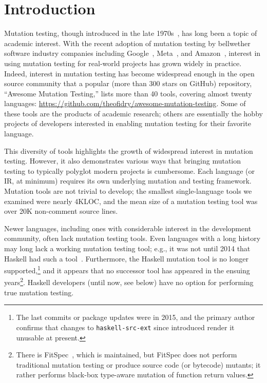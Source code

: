 \documentclass[sigconf,review, anonymous]{acmart}
\begin{document}
\maketitle



\section{Introduction}

Mutation testing, though introduced in the late
1970s~\cite{demillo1978hints,mathur2012foundations,demillo1978hints},
has long been a topic of academic interest.  With the recent adoption of mutation
testing by bellwether software industry companies including
Google~\cite{GoogleMut}, Meta~\cite{BellerFacebookMutation}, and
Amazon~\cite{AmazonMut}, interest in using mutation testing for
real-world projects has grown widely in practice. 
%
Indeed, interest in mutation testing has become widespread enough in the open
source community that a popular (more than 300 stars on GitHub)
repository, ``Awesome Mutation Testing,'' lists more than 40 tools,
covering almost twenty languages:
\url{https://github.com/theofidry/awesome-mutation-testing}.  Some of
these tools are the products of academic research; others are
essentially the hobby projects of developers interested in enabling
mutation testing for their favorite language.

This diversity of tools highlights the growth of widespread interest in mutation
testing.  However, it also demonstrates various ways that bringing mutation testing to
typically polyglot modern projects is cumbersome. Each language (or IR, at
minimum) requires its own underlying mutation and testing framework.
Mutation tools are not trivial to develop; the smallest
single-language tools we examined were nearly 4KLOC, and the mean size
of a mutation testing tool was over 20K non-comment source lines.

Newer languages, including ones with considerable interest
in the development community, often lack mutation testing tools.  Even
languages with a long history may long lack a working mutation testing
tool; e.g., it was not until 2014 that Haskell had such a tool~\cite{mucheck}. 
%
Furthermore, the Haskell mutation tool is no longer
supported,\footnote{The last commits or package updates were in 2015, and the
primary author confirms that changes to {\tt haskell-src-ext} since
introduced render it unusable at present.} and it
appears that no successor tool has appeared in the ensuing
years\footnote{There is FitSpec~\cite{FitSpec}, which is maintained,
  but FitSpec does not perform traditional mutation testing or produce
  source code (or bytecode) mutants; it rather
  performs black-box type-aware mutation of function return values.}.
Haskell developers (until now, see below) have no option for
performing true mutation testing.
\end{document}
